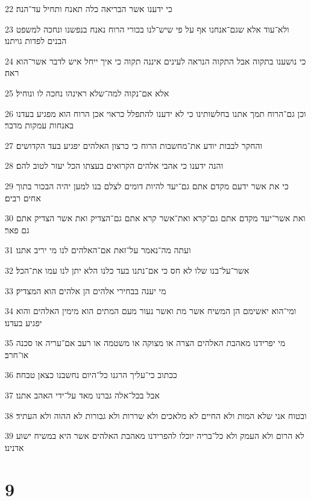 \par 22 כי ידענו אשר הבריאה כלה תאנח ותחיל עד־הנה׃
\par 23 ולא־עוד אלא שגם־אנחנו אף על פי שיש־לנו בכורי הרוח נאנח בנפשנו ונחכה למשפט הבנים לפדות גויתנו׃
\par 24 כי נושענו בתקוה אבל התקוה הנראה לעינים איננה תקוה כי איך ייחל איש לדבר אשר־הוא ראה׃
\par 25 אלא אם־נקוה למה־שלא ראינהו נחכה לו ונוחיל׃
\par 26 וכן גם־הרוח תמך אתנו בחלשותינו כי לא ידענו להתפלל כראוי אכן הרוח הוא מפגיע בעדנו באנחות עמקות מדבר׃
\par 27 והחקר לבבות יודע את־מחשבות הרוח כי כרצון האלהים יפגיע בעד הקדושים׃
\par 28 והנה ידענו כי אהבי אלהים הקרואים בעצתו הכל יעזר לטוב להם׃
\par 29 כי את אשר ידעם מקדם אתם גם־יעד להיות דומים לצלם בנו למען יהיה הבכור בתוך אחים רבים׃
\par 30 ואת אשר־יעד מקדם אתם גם־קרא ואת־אשר קרא אתם גם־הצדיק ואת אשר הצדיק אתם גם פאר׃
\par 31 ועתה מה־נאמר על־זאת אם־האלהים לנו מי יריב אתנו׃
\par 32 אשר־על־בנו שלו לא חס כי אם־נתנו בעד כלנו הלא יתן לנו עמו את־הכל׃
\par 33 מי יענה בבחירי אלהים הן אלהים הוא המצדיק׃
\par 34 ומי־הוא יאשימם הן המשיח אשר מת ואשר נעור מעם המתים הוא מימין האלהים והוא יפגיע בעדנו׃
\par 35 מי יפרידנו מאהבת האלהים הצרה או מצוקה או משטמה או רעב אם־עריה או סכנה או־חרב׃
\par 36 ככתוב כי־עליך הרגנו כל־היום נחשבנו כצאן טבחה׃
\par 37 אבל בכל־אלה גברנו מאד על־ידי האהב אתנו׃
\par 38 ובטוח אני שלא המות ולא החיים לא מלאכים ולא שררות ולא גבורות לא ההוה ולא העתיד׃
\par 39 לא הרום ולא העמק ולא כל־בריה יוכלו להפרידנו מאהבת האלהים אשר היא במשיח ישוע אדנינו׃

\chapter{9}


